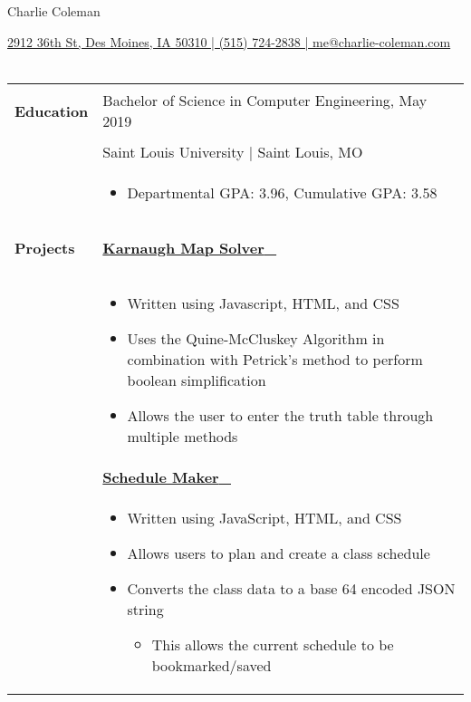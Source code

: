 \documentclass[11pt]{article}
\begin{document}
	\thispagestyle{empty}
	\noindent\begin{center}\huge{Charlie Coleman}\end{center}
	\noindent\uline{\hfill 2912 36th St, Des Moines, IA 50310 | (515) 724-2838 | me@charlie-coleman.com \hfill} \\\\
	\begin{small}
	\begin{tabularx}{\textwidth}{lX}
		\begin{large}\textbf{Education}\end{large} & Bachelor of Science in Computer Engineering, May 2019\\ 
		& Saint Louis University | Saint Louis, MO \\
		& \vspace{-\topsep} \begin{itemize}[noitemsep, nolistsep] \item Departmental GPA: 3.96, Cumulative GPA: 3.58 \end{itemize}\\
		\begin{large}\textbf{Projects}\end{large} & \uline{\textbf{Karnaugh Map Solver} \hfill ~}\\
		&\vspace{-0.7\topsep} \begin{itemize}[noitemsep, nolistsep]
			\item Written using Javascript, HTML, and CSS
			\item Uses the Quine-McCluskey Algorithm in combination with Petrick's method to perform boolean simplification
			\item Allows the user to enter the truth table through multiple methods
		\end{itemize}\\
		& \uline{\textbf{Schedule Maker} \hfill ~} \\
		& \vspace{-0.7\topsep} 
		\begin{itemize}[noitemsep, nolistsep]
			\item Written using JavaScript, HTML, and CSS
			\item Allows users to plan and create a class schedule
			\item Converts the class data to a base 64 encoded JSON string
			\begin{itemize}[noitemsep, topsep=0pt]
				\item This allows the current schedule to be bookmarked/saved

\end{itemize}
\end{itemize}
\end{tabularx}
\end{small}
\end{document}
